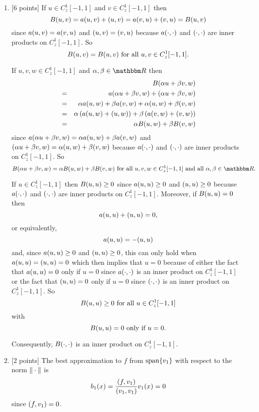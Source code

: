 \begin{solution}

\begin{enumerate}
\item {[6 points]} If $u\in C_z^1[-1,1]$ and $v\in C_z^1[-1,1]$ then
\[
B(u,v)=a(u,v)+(u,v)=a(v,u)+(v,u)=B(u,v)
\]
since $a(u,v)=a(v,u)$ and $(u,v)=(v,u)$ because $a(\cdot,\cdot)$ and $(\cdot,\cdot)$ are inner products on $C_z^1[-1,1]$. So
\[
B(u,v)=B(u,v)\mbox{ for all }u,v\in C_z^1[-1,1].
\]

If $u,v,w\in C_z^1[-1,1]$ and $\alpha,\beta\in\R$ then
\begin{eqnarray*}
&&B(\alpha u+\beta v,w)
\\
&=&a(\alpha u+\beta v,w)+(\alpha u+\beta v,w)
\\
&=&\alpha a(u,w)+\beta a(v,w)+\alpha(u,w)+\beta(v,w)
\\
&=&\alpha\left(a(u,w)+(u,w)\right)+\beta\left(a(v,w)+(v,w)\right)
\\
&=&\alpha B(u,w)+\beta B(v,w)
\end{eqnarray*}
since $a(\alpha u+\beta v,w)=\alpha a(u,w)+\beta a(v,w)$ and $(\alpha u+\beta v,w)=\alpha(u,w)+\beta(v,w)$ because $a(\cdot,\cdot)$ and $(\cdot,\cdot)$ are inner products on $C_z^1[-1,1]$. So
\[
B\ip{\alpha u+\beta v,w}=\alpha B\ip{u,w}+\beta B\ip{v,w}\mbox{ for all }u,v,w\in C_z^1[-1,1]\mbox{ and all }\alpha,\beta\in\R.
\]

If $u\in C_z^1[-1,1]$ then $B(u,u)\ge0$ since $a(u,u)\ge0$ and $(u,u)\ge0$ because $a(\cdot,\cdot)$ and $(\cdot,\cdot)$ are inner products on $C_z^1[-1,1]$. Moreover, if $B(u,u)=0$ then
\[
a(u,u)+(u,u)=0,
\]
or equivalently,
\[
a(u,u)=-(u,u)
\]
and, since $a(u,u)\ge0$ and $(u,u)\ge0$, this can only hold when $a(u,u)=(u,u)=0$ which then implies that $u=0$ because of either the fact that $a(u,u)=0$ only if $u=0$ since $a(\cdot,\cdot)$ is an inner product on $C_z^1[-1,1]$ or the fact that $(u,u)=0$ only if $u=0$ since $(\cdot,\cdot)$ is an inner product on $C_z^1[-1,1]$. So
\[
B(u,u)\ge0\mbox{ for all }u\in C_z^1[-1,1]
\]
with
\[
B(u,u)=0\mbox{ only if }u=0.
\]

Consequently, $B(\cdot,\cdot)$ is an inner product on $C_z^1[-1,1]$.

\item {[2 points]} The best approximation to $f$ from ${\rm span}\{v_1\}$ with respect to the norm $\|\cdot\|$ is
\[
b_1(x)={(f,v_1) \over (v_1,v_1)}v_1(x)=0
\]
since $(f,v_1)=0$.


\end{enumerate}
\end{solution}
